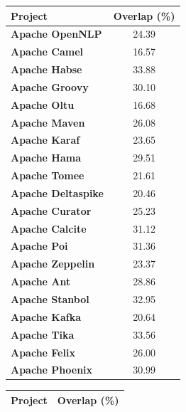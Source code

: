 





	\begin{table}[htbp]
	\small
	\centering

		\begin{tabular}{l|c}
			\hline
			\textbf{Project}           & \textbf{Overlap (\%)} \\ \hline
			\textbf{Apache OpenNLP}    &    24.39     \\ \hline
			\textbf{Apache Camel}      &    16.57     \\ \hline
			\textbf{Apache Habse}      &    33.88     \\ \hline
			\textbf{Apache Groovy}     &    30.10     \\ \hline
			\textbf{Apache Oltu}       &    16.68     \\ \hline
			\textbf{Apache Maven}      &    26.08     \\ \hline
			\textbf{Apache Karaf}      &    23.65     \\ \hline
			\textbf{Apache Hama}       &    29.51     \\ \hline
			\textbf{Apache Tomee}      &    21.61     \\ \hline
			\textbf{Apache Deltaspike} &    20.46     \\ \hline
			\textbf{Apache Curator}    &    25.23     \\ \hline
			\textbf{Apache Calcite}    &    31.12     \\ \hline
			\textbf{Apache Poi}        &    31.36     \\ \hline
			\textbf{Apache Zeppelin}   &    23.37     \\ \hline
			\textbf{Apache Ant}        &    28.86     \\ \hline
			\textbf{Apache Stanbol}    &    32.95     \\ \hline
			\textbf{Apache Kafka}      &    20.64     \\ \hline
			\textbf{Apache Tika}       &    33.56     \\ \hline
			\textbf{Apache Felix}      &    26.00     \\ \hline
			\textbf{Apache Phoenix}    &    30.99     \\ \hline
		\end{tabular}
\quad \quad \quad
\begin{tabular}{l|c}
	\hline
			\textbf{Project}           & \textbf{Overlap (\%)} \\ \hline

\end{tabular}
\end{table}
